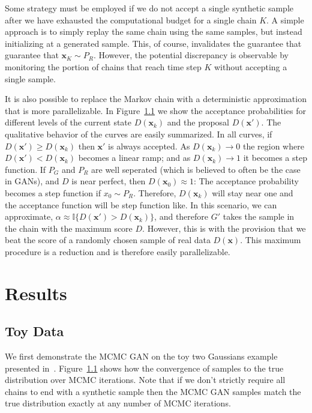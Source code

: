 \documentclass{article}
\renewcommand{\vec}[1]{{\boldsymbol{\mathbf{#1}}}} %
\newcommand{\I}{\mathbb{I}}
\newcommand{\sample}{\sim}
\begin{document}
Some strategy must be employed if we do not accept a single synthetic sample after we have exhausted the computational budget for a single chain $K$.
A simple approach is to simply replay the same chain using the same samples, but instead initializing at a generated sample.
This, of course, invalidates the guarantee that guarantee that $\vec x_K \sample P_R$.
However, the potential discrepancy is observable by monitoring the portion of chains that reach time step $K$ without accepting a single sample.


It is also possible to replace the Markov chain with a deterministic approximation that is more parallelizable.
In Figure~\ref{} we show the acceptance probabilities for different levels of the current state $D(\vec x_k)$ and the proposal $D(\vec x')$.
The qualitative behavior of the curves are easily summarized.
In all curves, if $D(\vec x') \geq D(\vec x_k)$ then $\vec x'$ is always accepted.
As $D(\vec x_k) \rightarrow 0$ the region where $D(\vec x') < D(\vec x_k)$ becomes a linear ramp; and as $D(\vec x_k) \rightarrow 1$ it becomes a step function.
If $P_G$ and $P_R$ are well seperated (which is believed to often be the case in GANs), and $D$ is near perfect, then $D(\vec x_0) \approx 1$: The acceptance probability becomes a step function if $x_0 \sample P_R$.
Therefore, $D(\vec x_k)$ will stay near one and the acceptance function will be step function like.
In this scenario, we can approximate, $\alpha \approx \I\{D(\vec x') > D(\vec x_k)\}$, and therefore $G'$ takes the sample in the chain with the maximum score $D$.
However, this is with the provision that we beat the score of a randomly chosen sample of real data $D(\vec x)$.
This maximum procedure is a reduction and is therefore easily parallelizable.


\section{Results}


\subsection{Toy Data}
We first demonstrate the MCMC GAN on the toy two Gaussians example presented in~\citet{}.
Figure~\ref{} shows how the convergence of samples to the true distribution over MCMC iterations.
Note that if we don't strictly require all chains to end with a synthetic sample then the MCMC GAN samples match the true distribution exactly at any number of MCMC iterations.
\end{document}
